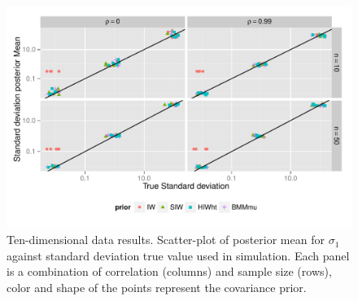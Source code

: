 \documentclass{article}
\begin{document}
\begin{figure}[htbp]
   \centering
   \includegraphics[width=\textwidth]{fig_s1_d10} 
    \vspace{-.5in}
   \caption{Ten-dimensional data results. Scatter-plot of posterior mean for $\sigma_1$  against standard deviation true value used in simulation. Each panel is a combination of correlation (columns) and sample size (rows),  color and shape of the points represent the covariance prior.  \label{devF2} }
\end{figure}
\end{document}
